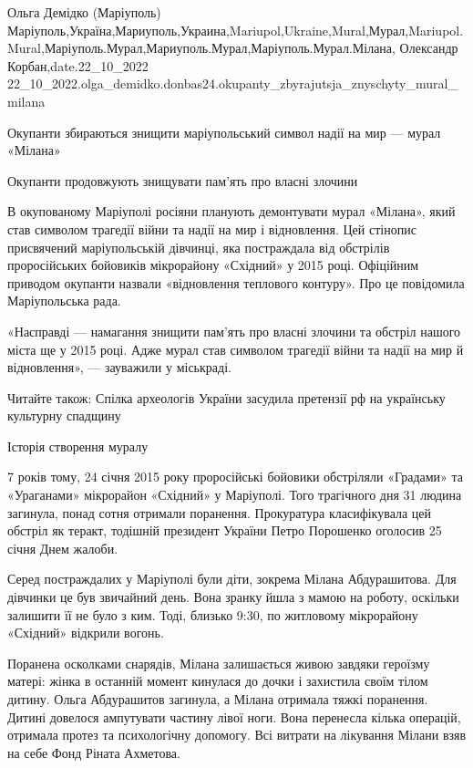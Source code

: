  
 
 
 
 

Ольга Демідко (Маріуполь)
Маріуполь,Україна,Мариуполь,Украина,Mariupol,Ukraine,Mural,Мурал,Mariupol.Mural,Маріуполь.Мурал,Мариуполь.Мурал,Маріуполь.Мурал.Мілана,
Олександр Корбан,date.22_10_2022
22_10_2022.olga_demidko.donbas24.okupanty_zbyrajutsja_znyschyty_mural_milana


Окупанти збираються знищити маріупольський символ надії на мир — мурал «Мілана»

Окупанти продовжують знищувати пам'ять про власні злочини

В окупованому Маріуполі росіяни планують демонтувати мурал «Мілана», який став
символом трагедії війни та надії на мир і відновлення. Цей стінопис присвячений
маріупольській дівчинці, яка постраждала від обстрілів проросійських бойовиків
мікрорайону «Східний» у 2015 році. Офіційним приводом окупанти назвали
«відновлення теплового контуру». Про це повідомила Маріупольська рада.

«Насправді — намагання знищити пам'ять про власні злочини та обстріл нашого
міста ще у 2015 році. Адже мурал став символом трагедії війни та надії на мир й
відновлення», — зауважили у міськраді.

Читайте також: Спілка археологів України засудила претензії рф на українську
культурну спадщину

Історія створення муралу

7 років тому, 24 січня 2015 року проросійські бойовики обстріляли «Градами» та
«Ураганами» мікрорайон «Східний» у Маріуполі. Того трагічного дня 31 людина
загинула, понад сотня отримали поранення. Прокуратура класифікувала цей обстріл
як теракт, тодішній президент України Петро Порошенко оголосив 25 січня Днем
жалоби.

Серед постраждалих у Маріуполі були діти, зокрема Мілана Абдурашитова. Для
дівчинки це був звичайний день. Вона зранку йшла з мамою на роботу, оскільки
залишити її не було з ким. Тоді, близько 9:30, по житловому мікрорайону
«Східний» відкрили вогонь.

Поранена осколками снарядів, Мілана залишається живою завдяки героїзму матері:
жінка в останній момент кинулася до дочки і захистила своїм тілом дитину. Ольга
Абдурашитов загинула, а Мілана отримала тяжкі поранення. Дитині довелося
ампутувати частину лівої ноги. Вона перенесла кілька операцій, отримала протез
та психологічну допомогу. Всі витрати на лікування Мілани взяв на себе Фонд
Ріната Ахметова.

